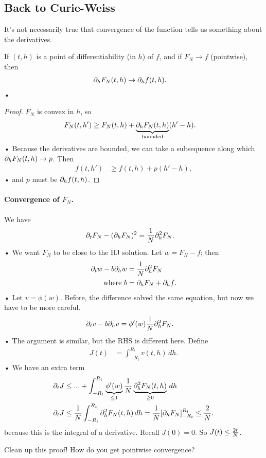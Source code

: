 \subsection{Back to Curie-Weiss}
It's not necessarily true that convergence of the function tells us something about the derivatives.
\begin{pr}
If $(t,h)$ is a point of differentiability (in $h$) of $f$, and if $F_N\to f$ (pointwise), then 
\begin{align*}
\partial_h F_N(t,h) &\to \partial_h f(t,h).
\end{align*}•
\end{pr}
\begin{proof}
$F_N$ is convex in $h$, so
\begin{align*}
F_N(t,h') &\ge  F_N(t,h) +\underbrace{\partial_h F_N(t,h)}_{\text{bounded}}(h'-h).
\end{align*}•
Because the derivatives are bounded, we can take a subsequence along which $\partial_h F_N(t,h)\to p$.
Then
\begin{align*}
f(t,h') &\ge f(t,h) + p(h'-h), 
\end{align*}•
and $p$ must be $\partial_h f(t,h)$.
\end{proof}
\paragraph{Convergence of $F_N$.}
We have
\begin{align*}
\partial_t F_N - (\partial_h F_N)^2 &= \frac{1}{N} \partial_h^2 F_N.
\end{align*}•
We want $F_N$ to be close to the HJ solution. Let $w=F_N-f$; then
\begin{align*}
\partial_t w - b \partial_h w &= \frac{1}{N} \partial_h^2 F_N\\
\text{where } b&= \partial_h F_N + \partial_h f.
\end{align*}•
Let $v=\phi(w)$. 
Before, the difference solved the same equation, but now we have to be more careful. 
\begin{align*}
\partial_t v - b \partial_h v &= \phi'(w) \frac{1}{N}\partial_h^2F_N.
\end{align*}•
The argument is similar, but the RHS is different here. Define
\begin{align*}
J(t) &=\int_{-R_t}^{R_t} v(t,h)\,dh.
\end{align*}•
We have an extra term
\begin{align*}
\partial_t J &\le ... + \int_{-R_t}^{R_t}\underbrace{\phi'(w)}_{\le 1} \frac{1}{N} \underbrace{\partial_h^2 F_N(t,h)}_{\ge0}\,dh \\
\partial_t J &\le \frac{1}{N} \int_{-R_t}^{R_t} \partial_h^2 F_N(t,h) \,dh
=\frac{1}{N} [\partial_h F_N]_{-R_t}^{R_t} \le \frac{2}{N}.
\end{align*}
because this is the integral of a derivative.
Recall $J(0)=0$. So $J(t)\le \frac{2t}{N}$.
\begin{exr}
Clean up this proof! How do you get pointwise convergence?
\end{exr}

